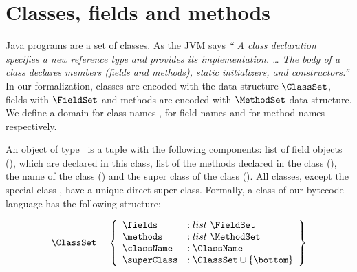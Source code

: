 
 \section{Classes, fields and methods}\label{clazz}
 Java programs are a set of classes. As the JVM says \textit{`` A class declaration specifies a new reference type and provides its implementation. \ldots
 The body of a class declares members (fields and methods), static initializers, and constructors.''}
 In our formalization, classes are encoded  with the data structure $\ClassSet$,  fields with $\FieldSet$ and
 methods are encoded with $\MethodSet$ data structure. 
 We define a domain for class names \ClassName, for field names \FieldName{} and for method names \MethodName{} respectively.

 An object of type \ClassSet \ is a tuple with the following components: list of field objects (\fields), which are declared in this class,
 list of the methods declared in the class (\methods), the name of the class (\className)   and the super class of the class (\superClass).
 All classes, except the special class \index{\Object}, have a unique direct super class. Formally, a class of our bytecode language 
 has the following structure:


 $$ \begin{array}{l}
         \ClassSet = \left\{\begin{array}{ll} \fields    & :    list \ \FieldSet \\
                                          \methods    & :    list \ \MethodSet \\
					  \className  & :   \ClassName \\
					  \superClass & :   \ClassSet \cup \{ \bottom \}
                    \end{array} \right\}
   \end{array} $$

